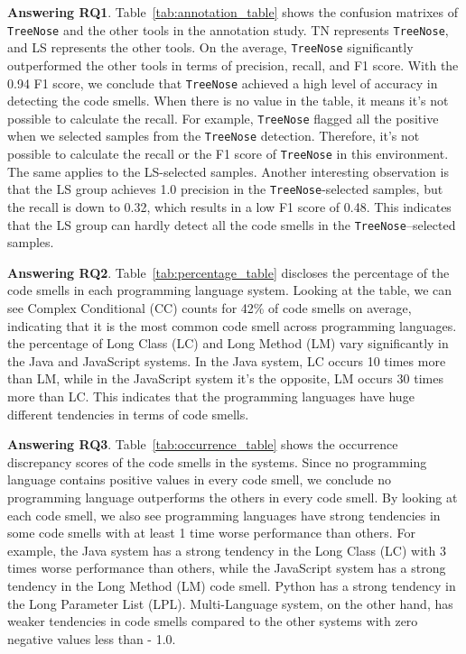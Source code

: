 


{\bf Answering RQ1}. Table~\ref{tab:annotation_table} shows the confusion
matrixes of \texttt{TreeNose} and the other tools in the annotation study. TN
represents \texttt{TreeNose}, and LS represents the other tools. On the
average, \texttt{TreeNose} significantly outperformed the other tools in terms
of precision, recall, and F1 score. With the 0.94 F1 score, we conclude that
\texttt{TreeNose} achieved a high level of accuracy in detecting the code
smells. When there is no value in the table, it means it's not possible to
calculate the recall. For example, \texttt{TreeNose} flagged all the positive
when we selected samples from the \texttt{TreeNose} detection. Therefore, it's
not possible to calculate the recall or the F1 score of \texttt{TreeNose} in
this environment. The same applies to the LS-selected samples. Another
interesting observation is that the LS group achieves 1.0 precision in the
\texttt{TreeNose}-selected samples, but the recall is down to 0.32, which
results in a low F1 score of 0.48. This indicates that the LS group can hardly
detect all the code smells in the \texttt{TreeNose}--selected samples.

{\bf Answering RQ2}. Table~\ref{tab:percentage_table} discloses the percentage
of the code smells in each programming language system. Looking at the table,
we can see Complex Conditional (CC) counts for 42\% of code smells on average,
indicating that it is the most common code smell across programming languages.
the percentage of Long Class (LC) and Long Method (LM) vary significantly in
the Java and JavaScript systems. In the Java system, LC occurs 10 times more
than LM, while in the JavaScript system it's the opposite, LM occurs 30 times
more than LC. This indicates that the programming languages have huge different
tendencies in terms of code smells.

{\bf Answering RQ3}. Table~\ref{tab:occurrence_table} shows the occurrence
discrepancy scores of the code smells in the systems. Since no programming
language contains positive values in every code smell, we conclude no
programming language outperforms the others in every code smell. By looking at
each code smell, we also see programming languages have strong tendencies in
some code smells with at least 1 time worse performance than others. For
example, the Java system has a strong tendency in the Long Class (LC) with 3
times worse performance than others, while the JavaScript system has a strong
tendency in the Long Method (LM) code smell. Python has a strong tendency in
the Long Parameter List (LPL). Multi-Language system, on the other hand, has
weaker tendencies in code smells compared to the other systems with zero
negative values less than - 1.0.
